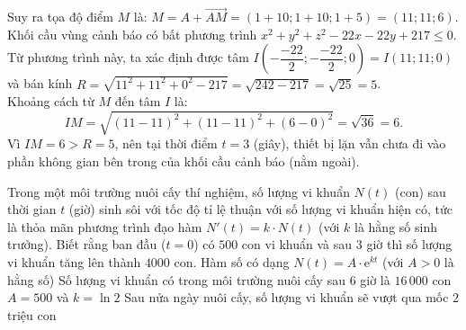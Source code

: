 \begin{ex}
{\begin{itemchoice}
			Suy ra tọa độ điểm $M$ là: $M = A + \vec{AM} = (1 + 10; 1 + 10; 1 + 5) = (11;11;6)$.\\
			Khối cầu vùng cảnh báo có bất phương trình $x^2 + y^2 + z^2 - 22x - 22y + 217 \le 0$.\\
			Từ phương trình này, ta xác định được tâm $I\left(-\dfrac{-22}{2}; -\dfrac{-22}{2}; 0\right) = I(11;11;0)$ và bán kính $R = \sqrt{11^2 + 11^2 + 0^2 - 217} = \sqrt{242 - 217} = \sqrt{25} = 5$.\\
			Khoảng cách từ $M$ đến tâm $I$ là:
			\[ IM = \sqrt{(11 - 11)^2 + (11 - 11)^2 + (6 - 0)^2} = \sqrt{36} = 6. \]
			Vì $IM = 6 > R = 5$, nên tại thời điểm $t = 3$ (giây), thiết bị lặn vẫn chưa đi vào phần không gian bên trong của khối cầu cảnh báo (nằm ngoài).
		\end{itemchoice}
	}
\end{ex}

\begin{ex}%
	Trong một môi trường nuôi cấy thí nghiệm, số lượng vi khuẩn $N(t)$ (con) sau thời gian $t$ (giờ) sinh sôi với tốc độ tỉ lệ thuận với số lượng vi khuẩn hiện có, tức là thỏa mãn phương trình đạo hàm $N'(t) = k \cdot N(t)$ (với $k$ là hằng số sinh trưởng). Biết rằng ban đầu ($t = 0$) có $500$ con vi khuẩn và sau $3$ giờ thì số lượng vi khuẩn tăng lên thành $4000$ con.
	\choiceTF
	{\True Hàm số có dạng $N(t) = A \cdot \mathrm{e}^{kt}$ (với $A > 0$ là hằng số)}
	{Số lượng vi khuẩn có trong môi trường nuôi cấy sau $6$ giờ là $16\,000$ con}
	{\True $A = 500$ và $k = \ln 2$}
	{\True Sau nửa ngày nuôi cấy, số lượng vi khuẩn sẽ vượt qua mốc $2$ triệu con}
\end{ex}

